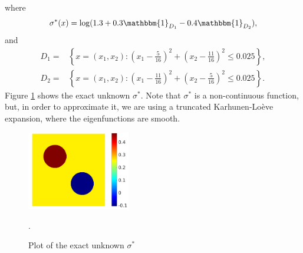 \documentclass[10pt]{article}
\begin{document}
where
\begin{equation*}
\sigma^*(x) = \log (1.3 + 0.3 \mathbbm{1}_{D_1} - 0.4 \mathbbm{1}_{D_2}),
\end{equation*}
and
\begin{align*}
D_1 = & \left \{ x = (x_1,x_2) \colon \left ( x_1 - \frac{5}{16} \right )^2 + \left ( x_2 - \frac{11}{16} \right )^2 \le 0.025 \right \}, \\
D_2 = & \left \{ x = (x_1,x_2) \colon \left ( x_1 - \frac{11}{16} \right )^2 + \left ( x_2 - \frac{5}{16} \right )^2 \le 0.025 \right \}.
\end{align*}
Figure \ref{fig:exact_unknown} shows the exact unknown $\sigma^*$. Note that $\sigma^*$ is a non-continuous function, but, in order to approximate it, we are using a truncated Karhunen-Lo\`eve expansion, where the eigenfunctions are smooth.

\begin{figure}[t]
	\centering
	\includegraphics[width = 0.4\textwidth]{sigma_exact}
	\caption{Plot of the exact unknown $\sigma^*$}.
	\label{fig:exact_unknown}
\end{figure}
\end{document}
